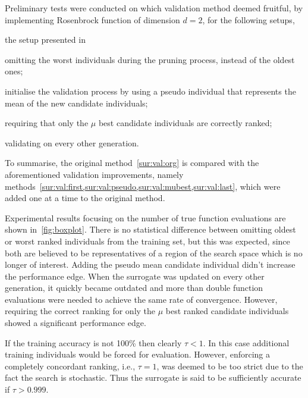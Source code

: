 Preliminary tests were conducted on which validation method deemed fruitful, by implementing  Rosenbrock function of dimension $d=2$, for the following setups, 
\begin{inparaenum}[{Method} (i)]
	\item the setup presented in \cite{Ru06:PPSN} %
	\item omitting the worst individuals during the pruning process, instead of the oldest ones; \label{sur:val:first}
	\item initialise the validation process by using a pseudo individual that represents the mean of the new candidate individuals; \label{sur:val:pseudo}
	\item requiring that only the $\mu$ best candidate individuals are correctly ranked; \label{sur:val:mubest}
	\item validating on every other generation. \label{sur:val:last}
\end{inparaenum}
To summarise, the original method~\cref{sur:val:org} is compared with the aforementioned validation improvements, namely methods~\cref{sur:val:first,sur:val:pseudo,sur:val:mubest,sur:val:last}, which were added one at a time to the original method. 


Experimental results focusing on the number of true function evaluations are shown in~\cref{fig:boxplot}. There is no statistical difference between omitting oldest or worst ranked individuals  from the training set, but this was expected, since both are believed to be representatives of a region of the search space which is no longer of interest. Adding the pseudo mean candidate individual didn't increase the performance edge. When the surrogate was updated on every other generation, it quickly became outdated and more than double function evaluations were needed to achieve the same rate of convergence. 
However, requiring the correct ranking for only the $\mu$ best ranked candidate individuals showed a significant performance edge. 

If the training accuracy is not 100\% then clearly $\tau < 1$. In this case additional training individuals  would be forced for evaluation. However, enforcing a completely concordant ranking, i.e.,  $\tau=1$, was deemed to be too strict due to the fact the search is stochastic. Thus the surrogate is said to be sufficiently accurate if $\tau>0.999$. 


